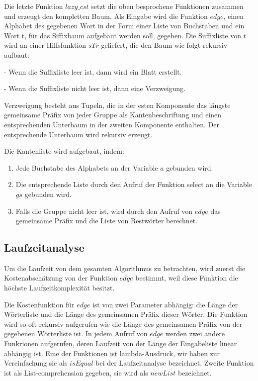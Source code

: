 \documentclass[12pt]{report}
\begin{document}
Die letzte Funktion $lazy\_cst$ setzt die oben besprochene Funktionen zusammen und erzeugt den kompletten Baum. Als Eingabe wird die Funktion $edge$, einen Alphabet des gegebenen Wort in der Form einer Liste von Buchstaben und ein Wort t, für das Siffixbaum aufgebaut werden soll, gegeben. Die Suffixliste von $t$ wird an einer Hilfsfunktion $sTr$ geliefert, die den Baum wie folgt rekursiv aufbaut:

    - Wenn die Suffixliste leer ist, dann wird ein Blatt erstellt.

    - Wenn die Suffixliste nicht leer ist, dann eine Verzweigung.

Verzweigung besteht aus Tupeln, die in der esten Komponente das längste gemeinsame Präfix von jeder Gruppe als Kantenbeschriftung und einen entsprechenden Unterbaum in der zweiten Komponente enthalten. Der entsprechende Unterbaum wird rekursiv erzeugt.

Die Kantenliste wird aufgebaut, indem:
\begin{enumerate}
    \item Jede Buchstabe des Alphabets an der Variable $a$ gebunden wird.
    \item Die entsprechende Liste durch den Aufruf der Funktion select an die Variable $gs$ gebunden wird.
    \item Falls die Gruppe nicht leer ist, wird durch den Aufruf von $edge$ das gemeinsame Präfix und die Liste von Restwörter berechnet.
\end{enumerate}

\subsection{Laufzeitanalyse}
\label{sec:Laufzeitanalyse}

Um die Laufzeit von dem gesamten Algorithmus zu betrachten, wird zuerst die Kostenabschätzung von der Funktion $edge$ bestimmt, weil diese Funktion die höchste Laufzeitkomplexität besitzt.

Die Kostenfunktion für $edge$ ist von zwei Parameter abhängig: die Länge der Wörterliste und die Länge des gemeinsamen Präfix dieser Wörter. Die Funktion wird so oft rekursiv aufgerufen wie die Länge des gemeinsamen Präfix von der gegebenen Wörterliste ist. In jedem Aufruf von $edge$ werden zwei andere Funkrionen aufgerufen, deren Laufzeit von der Länge der Eingabeliste linear abhängig ist. Eine der Funktionen ist lambda-Ausdruck, wir haben zur Vereinfachung sie als $isEqual$ bei der Laufzeitanalyse bezeichnet. Zweite Funktion ist als List-comprehension gegeben, sie wird als $newList$ bezeichnet.
\end{document}
